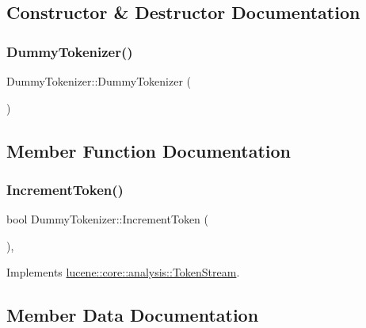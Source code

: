 \subsection{Constructor \& Destructor Documentation}
\mbox{\label{classDummyTokenizer_a42b1fc7050177a061fc4cd35fa3ddee3}} 
\subsubsection{\texorpdfstring{Dummy\+Tokenizer()}{DummyTokenizer()}}
{\footnotesize\ttfamily Dummy\+Tokenizer\+::\+Dummy\+Tokenizer (\begin{DoxyParamCaption}{ }\end{DoxyParamCaption})\hspace{0.3cm}{\ttfamily [inline]}}



\subsection{Member Function Documentation}
\mbox{\label{classDummyTokenizer_a11402de15d04027b30ce918814e1723d}} 
\subsubsection{\texorpdfstring{Increment\+Token()}{IncrementToken()}}
{\footnotesize\ttfamily bool Dummy\+Tokenizer\+::\+Increment\+Token (\begin{DoxyParamCaption}{ }\end{DoxyParamCaption})\hspace{0.3cm}{\ttfamily [inline]}, {\ttfamily [virtual]}}



Implements \mbox{\hyperlink{classlucene_1_1core_1_1analysis_1_1TokenStream_a614d4ea24a354d6f4354b4941b5124e2}{lucene\+::core\+::analysis\+::\+Token\+Stream}}.



\subsection{Member Data Documentation}
\mbox{\label{classDummyTokenizer_a6bfd1c116c7c2f98be9a605dc985f534}} 
